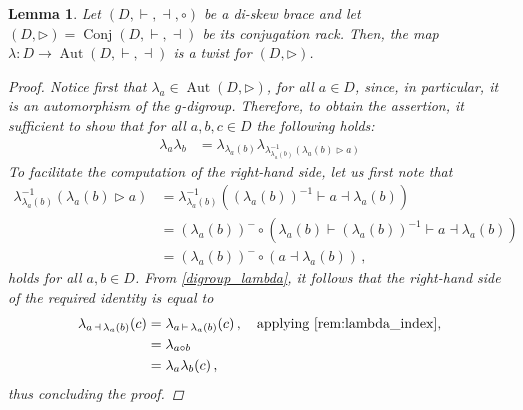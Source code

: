 \documentclass[preprint,1p]{elsarticle}
\numberwithin{equation}{section}
\newtheorem{lemma}[theor]{Lemma}
\theoremstyle{definition}               %
\newcommand{\vd}{\vdash}
\newcommand{\dv}{\dashv}
\DeclareMathOperator{\Aut}{Aut}
\DeclareMathOperator{\Conj}{Conj}
\begin{document}
\begin{lemma}\label{diskew_twist}
    Let $(D,\vd,\dv,\circ)$ be a di-skew brace and let $(D,\triangleright) = \Conj(D,\vd,\dv)$ be its conjugation rack.
    Then, the map $\lambda:D \to \Aut(D,\vd,\dv)$ is a twist for $(D,\triangleright)$.
    \begin{proof}
        Notice first that $\lambda_a \in \Aut(D,\triangleright)$, for all $a \in D$, since, in particular, it is an automorphism of the $g$-digroup.
        Therefore, to obtain the assertion, it sufficient to show that for all $a,b,c \in D$ the following holds:
        \begin{align*}
            \lambda_a\lambda_b
            &=
            \lambda_{\lambda_a(b)}\lambda_{\lambda^{-1}_{\lambda_a(b)}(\lambda_a(b) \triangleright a)}
        \end{align*}
        To facilitate the computation of the right-hand side, let us first note that
        \begin{align*}
            \lambda^{-1}_{\lambda_a(b)}(\lambda_a(b) \triangleright a)
            &= \lambda^{-1}_{\lambda_a(b)}((\lambda_a(b))^{-1} \vd a \dv \lambda_a(b)) \\
            &= (\lambda_a(b))^- \circ \left( \lambda_a(b) \vd (\lambda_a(b))^{-1} \vd a \dv \lambda_a(b) \right) \\
            &= (\lambda_a(b))^- \circ \left( a \dv \lambda_a(b) \right) \,,
        \end{align*}
        holds for all $a,b \in D$.
        From \cref{digroup_lambda}, it follows that the right-hand side of the required identity is equal to
        \begin{align*}
            \lambda_{a\, \dv\, \lambda_a(b)}(c)
            &= 
            \lambda_{a\, \vd\, \lambda_a(b)}(c)\,,
            \quad \text{applying \cref{rem:lambda_index},} \\
            &=
            \lambda_{a \circ b} \\
            &=
            \lambda_a\lambda_b(c) \,,
        \end{align*}
        thus concluding the proof.
    \end{proof}
\end{lemma}
\end{document}
